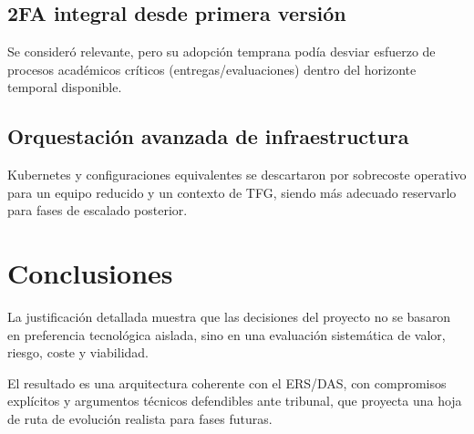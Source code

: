 \subsection{2FA integral desde primera versi\'on}

Se consider\'o relevante,
pero su adopci\'on temprana pod\'ia desviar esfuerzo de procesos acad\'emicos
cr\'iticos (entregas/evaluaciones) dentro del horizonte temporal disponible.

\subsection{Orquestaci\'on avanzada de infraestructura}

Kubernetes y configuraciones equivalentes se descartaron
por sobrecoste operativo para un equipo reducido y un contexto de TFG,
siendo m\'as adecuado reservarlo para fases de escalado posterior.

\FloatBarrier
\section{Conclusiones}

La justificaci\'on detallada muestra que las decisiones del proyecto
no se basaron en preferencia tecnol\'ogica aislada,
sino en una evaluaci\'on sistem\'atica de valor, riesgo, coste y viabilidad.

El resultado es una arquitectura coherente con el ERS/DAS,
con compromisos expl\'icitos y argumentos t\'ecnicos defendibles ante tribunal,
que proyecta una hoja de ruta de evoluci\'on realista para fases futuras.
